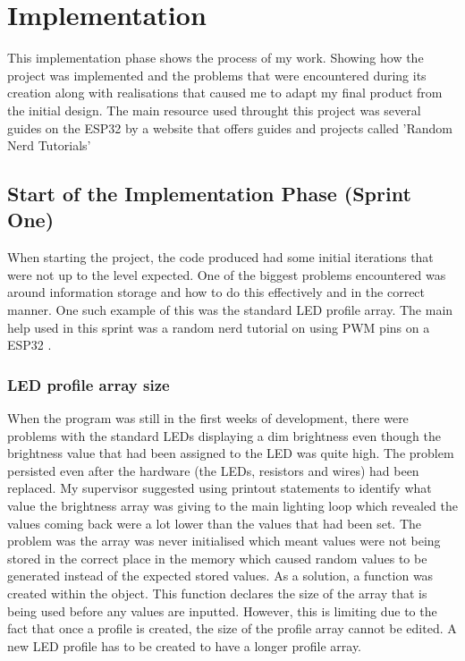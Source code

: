 \chapter{Implementation}
This implementation phase shows the process of my work. Showing how the project was implemented and the problems that were encountered during its creation along with realisations that caused me to adapt my final product from the initial design. The main resource used throught this project was several guides on the ESP32 by a website that offers guides and projects called 'Random Nerd Tutorials' \cite{RNTMain}

\section {Start of the Implementation Phase (Sprint One)}
When starting the project, the code produced had some initial iterations that were not up to the level expected. One of the biggest problems encountered was around information storage and how to do this effectively and in the correct manner. One such example of this was the standard LED profile array. The main help used in this sprint was a random nerd tutorial on using PWM pins on a ESP32 \cite{ESP32PWM}.

\subsection {LED profile array size}
When the program was still in the first weeks of development, there were problems with the standard LEDs displaying a dim brightness even though the brightness value that had been assigned to the LED was quite high. The problem persisted even after the hardware (the LEDs, resistors and wires) had been replaced. My supervisor suggested using printout statements to identify what value the brightness array was giving to the main lighting loop which revealed the values coming back were a lot lower than the values that had been set. The problem was the array was never initialised which meant values were not being stored in the correct place in the memory which caused random values to be generated instead of the expected stored values. As a solution, a function was created within the object. This function declares the size of the array that is being used before any values are inputted. However, this is limiting due to the fact that once a profile is created, the size of the profile array cannot be edited. A new LED profile has to be created to have a longer profile array.

